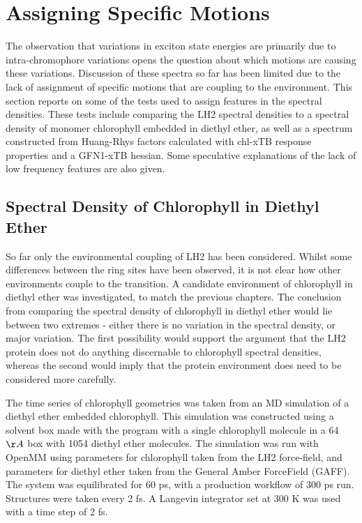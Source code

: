 \afterpartskip
\section{Assigning Specific Motions}
\label{sec:monomer_dimer_assign}

The observation that variations in exciton state energies are primarily due to intra-chromophore 
variations opens the question about which motions are causing these variations. Discussion
of these spectra so far has been limited due to the lack of assignment of specific
motions that are coupling to the environment. This section reports on some of the
tests used to assign features in the spectral densities. These tests include comparing
the LH2 spectral densities to a spectral density of monomer chlorophyll embedded
in diethyl ether, as well as a spectrum constructed from Huang-Rhys factors calculated
with chl-xTB response properties and a GFN1-xTB hessian. Some speculative explanations
of the lack of low frequency features are also given.

\subsection{Spectral Density of Chlorophyll in Diethyl Ether}
\label{subsec:specdens_ether}

So far only the environmental coupling of LH2 has been considered. Whilst some differences
between the ring sites have been observed, it is not clear how other environments 
couple to the \Qy transition. A candidate environment of chlorophyll in diethyl 
ether was investigated, to match the previous chapters. The conclusion from comparing
the spectral density of chlorophyll in diethyl ether would lie between two extremes
- either there is no variation in the spectral density, or major variation. The first
possibility would support the argument that the LH2 protein does not do anything 
discernable to chlorophyll spectral densities, whereas the second would imply that
the protein environment does need to be considered more carefully.

The time series of chlorophyll geometries was taken from an MD simulation of a diethyl 
ether embedded chlorophyll. This simulation was constructed using a solvent box 
made with the  program with a single chlorophyll  molecule in a 64 
$\AA{}$ box with 1054 diethyl ether molecules. The simulation was run with OpenMM 
using parameters for chlorophyll taken from the LH2 force-field, and parameters 
for diethyl ether taken from the General Amber ForceField (GAFF). The system was
equilibrated for 60 ps, with a production workflow of 300 ps run. Structures were 
taken every 2 fs. A Langevin integrator set at 300 K was used with a time step of 2 fs.

